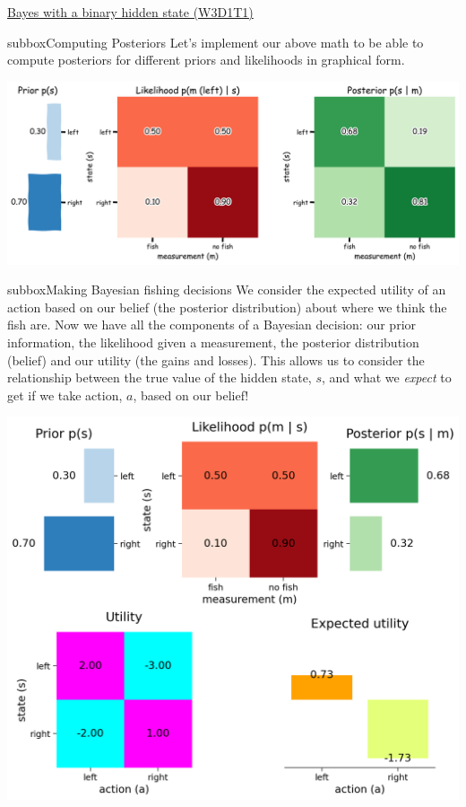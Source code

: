 \begin{textbox}{\href{https://compneuro.neuromatch.io/tutorials/W3D1_BayesianDecisions/student/W3D1_Tutorial1.html}{Bayes with a binary hidden state (W3D1T1)} }
\begin{subbox}{subbox}{Computing Posteriors}
\scriptsize
Let's implement our above math to be able to compute posteriors for different priors and likelihoods in graphical form.

\centering
\includegraphics[scale=0.12]{Figures/BD/BD_Figure3.png}

 
\end{subbox}

\begin{subbox}{subbox}{Making Bayesian fishing decisions}
\scriptsize
We consider the expected utility of an action based on our belief (the posterior distribution) about where we think the fish are. Now we have all the components of a Bayesian decision: our prior information, the likelihood given a measurement, the posterior distribution (belief) and our utility (the gains and losses). This allows us to consider the relationship between the true value of the hidden state, $s$, and what we \textit{expect} to get if we take action, $a$, based on our belief!


\centering
\includegraphics[scale=0.25]{Figures/BD/BD_Figure4.png}

 
\end{subbox}
\end{textbox}

